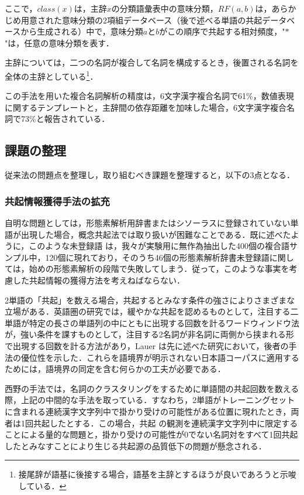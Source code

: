 \vspace{-0.3cm}
ここで，$class(x)$は，主辞$x$の分類語彙表中の意味分類，$RF(a,b)$は，あらかじめ用意された意味分類の2項組データベース（後で述べる単語の共起データベースから生成される）中で，意味分類$a$と$b$がこの順序で共起する相対頻度，"$\ast$"は，任意の意味分類を表す．

主辞については，二つの名詞が複合して名詞を構成するとき，後置される名詞を全体の主辞としている\footnote{接尾辞が語基に後接する場合，語基を主辞とするほうが良いであろうと示唆している．}．

この手法を用いた複合名詞解析の精度は，6文字漢字複合名詞で61\%，数値表現に関するテンプレートと，主辞間の依存距離を加味した場合，6文字漢字複合名詞で73\%と報告されている\cite{小林1996}．

\vspace{-2mm}
\subsection{課題の整理}\label{課題の整理}
\vspace{-1mm}
従来法の問題点を整理し，取り組むべき課題を整理すると，以下の3点となる．
\vspace{-2mm}
\subsubsection{共起情報獲得手法の拡充}\label{共起情報獲得手法の拡充}
自明な問題としては，形態素解析用辞書またはシソーラスに登録されていない単語が出現した場合，概念共起法では取り扱いが困難なことである．既に述べたように，このような未登録語\break
は，我々が実験用に無作為抽出した400個の複合語サンプル中，120個に現れており，そのうち46個の形態素解析辞書未登録語に関しては，始めの形態素解析の段階で失敗してしまう．従って，このような事実を考慮した共起情報の獲得方法を考えねばならない．

2単語の「共起」を数える場合，共起するとみなす条件の強さによりさまざまな立場がある．英語圏の研究では，緩やかな共起を認めるものとして，注目する二単語が特定の長さの単語列の中にともに出現する回数を計るワードウィンドウ法\cite{Yarowsky1992}が，強い条件を課すものとして，注目する2名詞が非名詞に両側から挟まれる形で出現する回数を計る方法\cite{Pustejovsky1993}があり，Lauer は先に述べた研究において，後者の手法の優位性を示した\cite{Lauer1995}．これらを語境界が明示されない日本語コーパスに適用するためには，語境界の同定を含む何らかの工夫が必要である．

西野の手法では，名詞のクラスタリングをするために単語間の共起回数を数える際，上記の中間的な手法を取っている．すなわち，2単語がトレーニングセットに含まれる連続漢字文字列中で掛かり受けの可能性がある位置に現れたとき，両者は1回共起したとする．この場合，共起\break
の観測を連続漢字文字列中に限定することによる量的な問題と，掛かり受けの可能性が0でない名詞対をすべて1回共起したとみなすことにより生じる共起源の品質低下の問題が懸念される．

